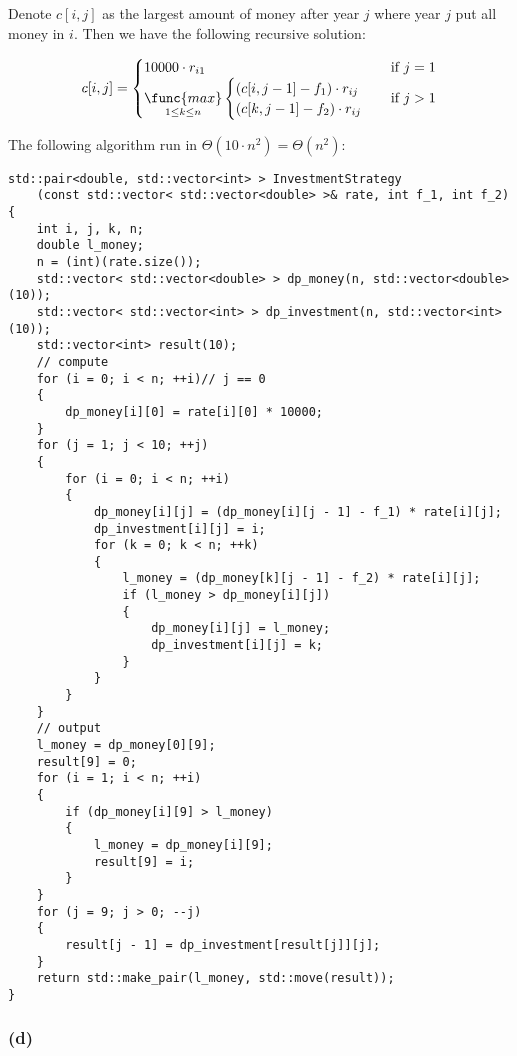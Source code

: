 Denote $c[i,j]$ as the largest amount of money after year $j$
where year $j$ put all money in $i$.
Then we have the following recursive solution:

\begin{equation*}
    c[i,j] = 
    \begin{cases}
        10000 \cdot r_{i1} & \text{if } j = 1 \\
        \mathop{\func{max}}\limits_{1 \leq k \leq n}
        \begin{cases}
            (c[i,j-1] - f_1) \cdot r_{ij} \\
            (c[k,j-1] - f_2) \cdot r_{ij}
        \end{cases}
        & \text{if } j > 1
    \end{cases}
\end{equation*}

The following algorithm run in $\Theta(10 \cdot n^2) = \Theta(n^2)$:

\begin{verbatim}
std::pair<double, std::vector<int> > InvestmentStrategy
    (const std::vector< std::vector<double> >& rate, int f_1, int f_2)
{
    int i, j, k, n;
    double l_money;
    n = (int)(rate.size());
    std::vector< std::vector<double> > dp_money(n, std::vector<double>(10)); 
    std::vector< std::vector<int> > dp_investment(n, std::vector<int>(10));
    std::vector<int> result(10);
    // compute
    for (i = 0; i < n; ++i)// j == 0
    {
        dp_money[i][0] = rate[i][0] * 10000;
    }
    for (j = 1; j < 10; ++j)
    {
        for (i = 0; i < n; ++i)
        {
            dp_money[i][j] = (dp_money[i][j - 1] - f_1) * rate[i][j];
            dp_investment[i][j] = i;
            for (k = 0; k < n; ++k)
            {
                l_money = (dp_money[k][j - 1] - f_2) * rate[i][j];
                if (l_money > dp_money[i][j])
                {
                    dp_money[i][j] = l_money;
                    dp_investment[i][j] = k;
                }
            }
        }
    }
    // output
    l_money = dp_money[0][9];
    result[9] = 0;
    for (i = 1; i < n; ++i)
    {
        if (dp_money[i][9] > l_money)
        {
            l_money = dp_money[i][9];
            result[9] = i;
        }
    }
    for (j = 9; j > 0; --j)
    {
        result[j - 1] = dp_investment[result[j]][j];
    }
    return std::make_pair(l_money, std::move(result));
}
\end{verbatim}

\subsubsection*{(d)}

